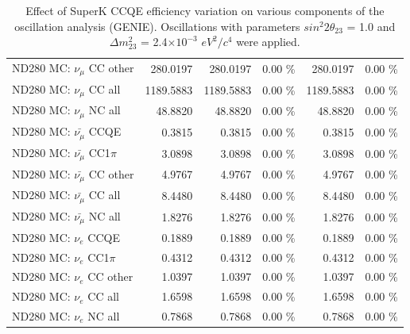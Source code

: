 \begin{table}
\begin{tabular}{| l | r | r  r | r  r |}
                                        ND280 MC: $\nu_{\mu}$ CC other &        280.0197 &        280.0197 &  0.00 \%  &        280.0197 &  0.00 \%  \\ 
                                          ND280 MC: $\nu_{\mu}$ CC all &       1189.5883 &       1189.5883 &  0.00 \%  &       1189.5883 &  0.00 \%  \\ 
                                          ND280 MC: $\nu_{\mu}$ NC all &         48.8820 &         48.8820 &  0.00 \%  &         48.8820 &  0.00 \%  \\ 
                                      ND280 MC: $\bar{\nu_{\mu}}$ CCQE &          0.3815 &          0.3815 &  0.00 \%  &          0.3815 &  0.00 \%  \\ 
                                  ND280 MC: $\bar{\nu_{\mu}}$ CC1$\pi$ &          3.0898 &          3.0898 &  0.00 \%  &          3.0898 &  0.00 \%  \\ 
                                  ND280 MC: $\bar{\nu_{\mu}}$ CC other &          4.9767 &          4.9767 &  0.00 \%  &          4.9767 &  0.00 \%  \\ 
                                    ND280 MC: $\bar{\nu_{\mu}}$ CC all &          8.4480 &          8.4480 &  0.00 \%  &          8.4480 &  0.00 \%  \\ 
                                    ND280 MC: $\bar{\nu_{\mu}}$ NC all &          1.8276 &          1.8276 &  0.00 \%  &          1.8276 &  0.00 \%  \\ 
                                              ND280 MC: $\nu_{e}$ CCQE &          0.1889 &          0.1889 &  0.00 \%  &          0.1889 &  0.00 \%  \\ 
                                          ND280 MC: $\nu_{e}$ CC1$\pi$ &          0.4312 &          0.4312 &  0.00 \%  &          0.4312 &  0.00 \%  \\ 
                                          ND280 MC: $\nu_{e}$ CC other &          1.0397 &          1.0397 &  0.00 \%  &          1.0397 &  0.00 \%  \\ 
                                            ND280 MC: $\nu_{e}$ CC all &          1.6598 &          1.6598 &  0.00 \%  &          1.6598 &  0.00 \%  \\ 
                                            ND280 MC: $\nu_{e}$ NC all &          0.7868 &          0.7868 &  0.00 \%  &          0.7868 &  0.00 \%  \\ 
\hline
\end{tabular}
\caption{ 
  Effect of SuperK CCQE efficiency variation
  on various components of the oscillation analysis (GENIE).
  Oscillations with parameters $sin^{2}2\theta_{23}$ = 1.0 and $\Delta m^{2}_{23}$ = 2.4$\times10^{-3}$ $eV^{2}/c^{4}$ were applied.  
}
\label{tab:genie_sk_ccqe_eff}
\end{table}

